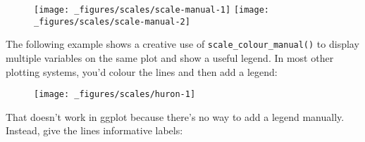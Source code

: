 \begin{figure}[H]
  \texttt{[image: \_figures/scales/scale-manual-1]}%
  \texttt{[image: \_figures/scales/scale-manual-2]}
\end{figure}

The following example shows a creative use of
\texttt{scale\_colour\_manual()} to display multiple variables on the
same plot and show a useful legend. In most other plotting systems,
you'd colour the lines and then add a legend: 

\begin{Shaded}
\begin{Highlighting}[]
\StringTok{ }\NormalTok{(} \OperatorTok{:}\NormalTok{, } 
\OperatorTok{+}
\StringTok{  }\NormalTok{(}\NormalTok{(}\OperatorTok{+}\StringTok{ }\NormalTok{), } \NormalTok{) }\OperatorTok{+}
\StringTok{  }\NormalTok{(}\NormalTok{(}\OperatorTok{-}\StringTok{ }\NormalTok{), } \NormalTok{) }
\end{Highlighting}
\end{Shaded}

\begin{figure}[H]
  \centering
  \texttt{[image: \_figures/scales/huron-1]}
\end{figure}

That doesn't work in ggplot because there's no way to add a legend
manually. Instead, give the lines informative labels:

\begin{Shaded}
\begin{Highlighting}[]
\OperatorTok{+}
\StringTok{  }\NormalTok{(}\NormalTok{(}\OperatorTok{+}\StringTok{ }\NormalTok{, } \NormalTok{)) }\OperatorTok{+}
\StringTok{  }\NormalTok{(}\NormalTok{(}\OperatorTok{-}\StringTok{ }\NormalTok{, } \NormalTok{)) }
\end{Highlighting}
\end{Shaded}

